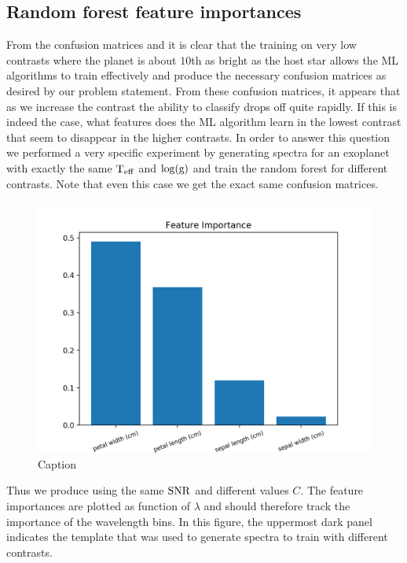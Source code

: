 \subsection{Random forest feature importances}
From the confusion matrices  and  it is clear that the training on very low contrasts where the planet is about $10$th as bright as the host star allows the ML algorithms to train effectively and produce the necessary confusion matrices as desired by our problem statement.
From these confusion matrices, it appears that as we increase the contrast the ability to classify drops off quite rapidly.
If this is indeed the case, what features does the ML algorithm learn in the lowest contrast that seem to disappear in the higher contrasts.
In order to answer this question we performed a very specific experiment by generating spectra for an exoplanet with exactly the same $\rm{T_{eff}}$ and $\rm{\log(g)}$ and train the random forest for different contrasts.
Note that even this case we get the exact same confusion matrices.
\begin{figure}
    \centering
    \includegraphics[scale=0.5]{images/Chapter3/feature_importances_Randomforest.png}
    \caption{Caption}
    \label{fig:RF-C-importances}
\end{figure}
Thus we produce  using the same $\rm{SNR}$ and different values $C$.
The feature importances are plotted as function of $\lambda$ and should therefore track the importance of the wavelength bins.
In this figure, the uppermost dark panel indicates the template that was used to generate spectra to train with different contrasts.
